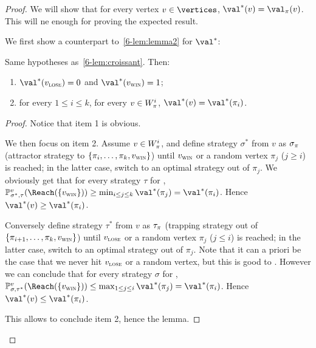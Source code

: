 \begin{proof}
  We will show that for every vertex $v \in \vertices$, $\val^*(v) =
  \val_\perm(v)$. This will ne enough for proving the expected result.

  We first show a counterpart to~\cref{6-lem:lemma2} for
  $\val^*$:
  \begin{lemma}
    Same hypotheses as~\cref{6-lem:croissant}. Then:
    \begin{enumerate}
    \item $\val^*(\vlose) = 0$ and $\val^*(\vwin) = 1$;
    \item for every $1 \le i \le k$, for every $v \in W_\pi^i$,
      $\val^*(v) = \val^*(\perm_i)$.
    \end{enumerate}
  \end{lemma}

  \begin{proof}
    Notice that item 1 is obvious. 

    We then focus on item 2.  Assume $v \in W_\pi^i$, and define
    strategy $\sigma^*$ from $v$ as $\sigma_\pi$ (attractor strategy
    to $\{\pi_i,\ldots,\pi_k,v_{\textsc{win}}\}$) until $v_{\textsc{win}}$ or a random
    vertex $\pi_j$ ($j \ge i$) is reached; in the latter case, switch
    to an optimal strategy out of $\pi_j$. We obviously get that for
    every strategy $\tau$ for \Adam,
    $\probm_{\sigma^*,\tau}^v(\Reach(\{\vwin\})) \ge \min_{i \le j \le
      k}\val^*(\perm_j) = \val^*(\perm_i)$. Hence $\val^*(v) \ge
    \val^*(\perm_i)$.
    
    Conversely define strategy $\tau^*$ from $v$ as $\tau_\pi$
    (trapping strategy out of $\{\pi_{i+1},\ldots,\pi_k,v_{\textsc{win}}\}$)
    until $v_{\textsc{lose}}$ or a random vertex $\pi_j$ ($j \le i$) is reached;
    in the latter case, switch to an optimal strategy out of
    $\pi_j$. Note that it can a priori be the case that we never hit
    $v_{\textsc{lose}}$ or a random vertex, but this is good to \Adam. However we
    can conclude that for every strategy $\sigma$ for \Eve,
    $\probm_{\sigma,\tau^*}^v(\Reach(\{\vwin\})) \le \max_{1 \le j \le
      i}\val^*(\perm_j) = \val^*(\perm_i)$. Hence
    $\val^*(v) \le \val^*(\perm_i)$.

    This allows to conclude item 2, hence the lemma.
  \end{proof}


\end{proof}
